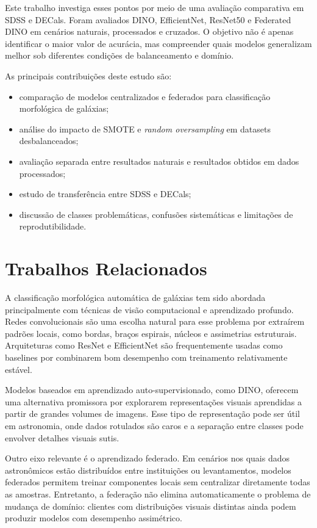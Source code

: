 \documentclass[conference]{IEEEtran}
\begin{document}
Este trabalho investiga esses pontos por meio de uma avaliação comparativa em SDSS e DECals. Foram avaliados DINO, EfficientNet, ResNet50 e Federated DINO em cenários naturais, processados e cruzados. O objetivo não é apenas identificar o maior valor de acurácia, mas compreender quais modelos generalizam melhor sob diferentes condições de balanceamento e domínio.

As principais contribuições deste estudo são:

\begin{itemize}
    \item comparação de modelos centralizados e federados para classificação morfológica de galáxias;
    \item análise do impacto de SMOTE e \textit{random oversampling} em datasets desbalanceados;
    \item avaliação separada entre resultados naturais e resultados obtidos em dados processados;
    \item estudo de transferência entre SDSS e DECals;
    \item discussão de classes problemáticas, confusões sistemáticas e limitações de reprodutibilidade.
\end{itemize}

\section{Trabalhos Relacionados}
\label{sec:related_work}

A classificação morfológica automática de galáxias tem sido abordada principalmente com técnicas de visão computacional e aprendizado profundo. Redes convolucionais são uma escolha natural para esse problema por extraírem padrões locais, como bordas, braços espirais, núcleos e assimetrias estruturais. Arquiteturas como ResNet e EfficientNet são frequentemente usadas como baselines por combinarem bom desempenho com treinamento relativamente estável.

Modelos baseados em aprendizado auto-supervisionado, como DINO, oferecem uma alternativa promissora por explorarem representações visuais aprendidas a partir de grandes volumes de imagens. Esse tipo de representação pode ser útil em astronomia, onde dados rotulados são caros e a separação entre classes pode envolver detalhes visuais sutis.

Outro eixo relevante é o aprendizado federado. Em cenários nos quais dados astronômicos estão distribuídos entre instituições ou levantamentos, modelos federados permitem treinar componentes locais sem centralizar diretamente todas as amostras. Entretanto, a federação não elimina automaticamente o problema de mudança de domínio: clientes com distribuições visuais distintas ainda podem produzir modelos com desempenho assimétrico.
\end{document}
